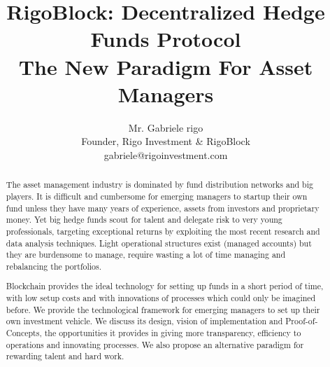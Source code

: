 \documentclass[9pt,oneside]{amsart}
\title{RigoBlock: Decentralized Hedge Funds Protocol \\ {\smaller \textbf{ The New Paradigm For Asset Managers}}}
\author{
    Mr. Gabriele rigo\\
    Founder, Rigo Investment \& RigoBlock\\
    gabriele@rigoinvestment.com
}
\begin{document}
\pagecolor{lightyellow}

\begin{abstract}
The asset management industry is dominated by fund distribution networks and big players. It is difficult and cumbersome for emerging managers to startup their own fund unless they have many years of experience, assets from investors and proprietary money. Yet big hedge funds scout for talent and delegate risk to very young professionals, targeting exceptional returns by exploiting the most recent research and data analysis techniques. Light operational structures exist (managed accounts) but they are burdensome to manage, require wasting a lot of time managing and rebalancing the portfolios.

Blockchain provides the ideal technology for setting up funds in a short period of time, with low setup costs and with innovations of processes which could only be imagined before. We provide the technological framework for emerging managers to set up their own investment vehicle. We discuss its design, vision of implementation and Proof-of-Concepts, the opportunities it provides in giving more transparency, efficiency to operations and innovating processes. We also propose an alternative paradigm for rewarding talent and hard work.
\end{abstract}

\maketitle
\end{document}
